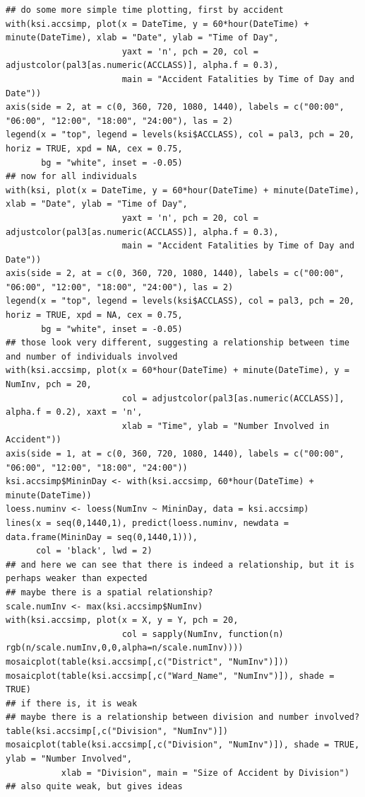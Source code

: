 \documentclass{article}
\begin{document}
\begin{lstlisting}
## do some more simple time plotting, first by accident
with(ksi.accsimp, plot(x = DateTime, y = 60*hour(DateTime) + minute(DateTime), xlab = "Date", ylab = "Time of Day",
                       yaxt = 'n', pch = 20, col = adjustcolor(pal3[as.numeric(ACCLASS)], alpha.f = 0.3),
                       main = "Accident Fatalities by Time of Day and Date"))
axis(side = 2, at = c(0, 360, 720, 1080, 1440), labels = c("00:00", "06:00", "12:00", "18:00", "24:00"), las = 2)
legend(x = "top", legend = levels(ksi$ACCLASS), col = pal3, pch = 20, horiz = TRUE, xpd = NA, cex = 0.75,
       bg = "white", inset = -0.05)
## now for all individuals
with(ksi, plot(x = DateTime, y = 60*hour(DateTime) + minute(DateTime), xlab = "Date", ylab = "Time of Day",
                       yaxt = 'n', pch = 20, col = adjustcolor(pal3[as.numeric(ACCLASS)], alpha.f = 0.3),
                       main = "Accident Fatalities by Time of Day and Date"))
axis(side = 2, at = c(0, 360, 720, 1080, 1440), labels = c("00:00", "06:00", "12:00", "18:00", "24:00"), las = 2)
legend(x = "top", legend = levels(ksi$ACCLASS), col = pal3, pch = 20, horiz = TRUE, xpd = NA, cex = 0.75,
       bg = "white", inset = -0.05)
## those look very different, suggesting a relationship between time and number of individuals involved
with(ksi.accsimp, plot(x = 60*hour(DateTime) + minute(DateTime), y = NumInv, pch = 20,
                       col = adjustcolor(pal3[as.numeric(ACCLASS)], alpha.f = 0.2), xaxt = 'n',
                       xlab = "Time", ylab = "Number Involved in Accident"))
axis(side = 1, at = c(0, 360, 720, 1080, 1440), labels = c("00:00", "06:00", "12:00", "18:00", "24:00"))
ksi.accsimp$MininDay <- with(ksi.accsimp, 60*hour(DateTime) + minute(DateTime))
loess.numinv <- loess(NumInv ~ MininDay, data = ksi.accsimp)
lines(x = seq(0,1440,1), predict(loess.numinv, newdata = data.frame(MininDay = seq(0,1440,1))),
      col = 'black', lwd = 2)
## and here we can see that there is indeed a relationship, but it is perhaps weaker than expected
## maybe there is a spatial relationship?
scale.numInv <- max(ksi.accsimp$NumInv)
with(ksi.accsimp, plot(x = X, y = Y, pch = 20,
                       col = sapply(NumInv, function(n) rgb(n/scale.numInv,0,0,alpha=n/scale.numInv))))
mosaicplot(table(ksi.accsimp[,c("District", "NumInv")]))
mosaicplot(table(ksi.accsimp[,c("Ward_Name", "NumInv")]), shade = TRUE)
## if there is, it is weak
## maybe there is a relationship between division and number involved?
table(ksi.accsimp[,c("Division", "NumInv")])
mosaicplot(table(ksi.accsimp[,c("Division", "NumInv")]), shade = TRUE, ylab = "Number Involved",
           xlab = "Division", main = "Size of Accident by Division")
## also quite weak, but gives ideas


\end{lstlisting}
\end{document}
